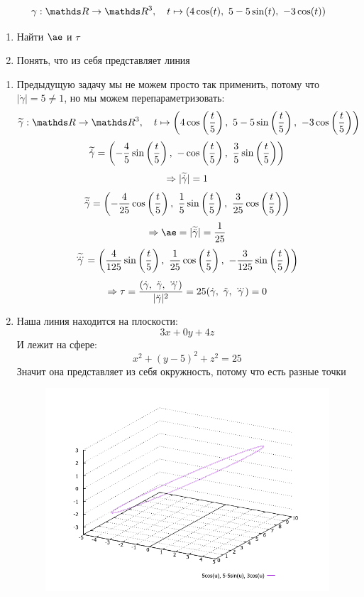 \documentclass[main]{subfiles}
\begin{document}
    \begin{Task}
      \[\gamma: \R \ra \R^3,\q t \mapsto (4 \cos(t),\ 5-5 \sin(t),\ -3\cos(t))\]
      \begin{enumerate}
        \item Найти $\ae$ и $\tau$
        \item Понять, что из себя представляет линия
      \end{enumerate}
    \end{Task}

    \begin{sol}
      \begin{enumerate}
        \item Предыдущую задачу мы не можем просто так применить, потому что $|\dot{\gamma}|=5 \neq 1$, но мы можем перепараметризовать:
        \[\w{\gamma}: \R \ra \R^3,\q t \mapsto
        \Br{
            4 \cos\Br{\frac{t}{5}},\
            5-5 \sin\Br{\frac{t}{5}},\
            -3\cos\Br{\frac{t}{5}}
        }\]
        \[\widetilde{\dot{\gamma}} =
        \left(
            -\frac{4}{5} \sin\left(\frac{t}{5}\right),\
            -\cos\left(\frac{t}{5}\right),\
            \frac{3}{5} \sin\left(\frac{t}{5}\right)
        \right)\]
        \[\Rightarrow |\widetilde{\dot{\gamma}}|=1\]
        \[\widetilde{\ddot{\gamma}} =
        \left(
            -\frac{4}{25} \cos\left(\frac{t}{5}\right),\
            \frac{1}{5} \sin\left(\frac{t}{5}\right),\
            \frac{3}{25} \cos\left(\frac{t}{5}\right)
        \right)\]
        \[\Ra \ae = |\w{\ddot{\gamma}}| = \frac{1}{25}\]
        \[\widetilde{\overset{{}_{\displaystyle ...}}{\gamma}} =
        \left(
            \frac{4}{125} \sin\left(\frac{t}{5}\right),\
            \frac{1}{25} \cos\left(\frac{t}{5}\right),\
            -\frac{3}{125} \sin\left(\frac{t}{5}\right)
        \right)\]
        \[\Ra \tau = \frac{(\dot{\gamma},\ \ddot{\gamma},\ \dddot{\gamma})}{|\ddot{\gamma}|^2}=25 (\dot{\gamma},\ \ddot{\gamma},\ \dddot{\gamma})=0\]
        \item Наша линия находится на плоскости:
        \[3x+0y+4z\]
        И лежит на сфере:
        \[x^2+(y-5)^2+z^2=25\]
        Значит она представляет из себя окружность, потому что есть разные точки
        \begin{figure}[H]
            \includegraphics[scale=0.6]{pics/2_2.png}
            \centering
        \end{figure}
      \end{enumerate}
    \end{sol}
\end{document}
